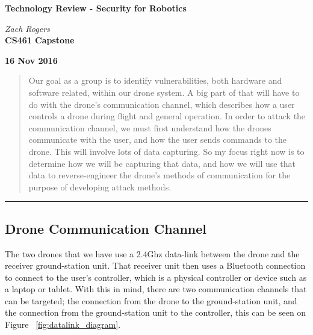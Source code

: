 \documentclass[IEEEtran,letterpaper,10pt,titlepage,draftclsnofoot,onecolumn]{article}
\begin{document}
\begin{titlepage}
  \begin{center}
    \vspace*{1cm}

    \huge
    \textbf{Technology Review - Security for Robotics}
  \vspace{0.5cm}

    \textit{Zach Rogers}\\
  \vspace{0.5cm}
    \vfill
    \large
    \textbf{CS461 Capstone}\\
  \vspace{5mm}

    \textbf{16 Nov 2016}\\

    \vfill
    \end{center}
\end{titlepage}

\begin{abstract}
Our goal as a group is to identify vulnerabilities, both hardware and software related, within our drone system.
A big part of that will have to do with the drone's communication channel, which describes how a user controls a
drone during flight and general operation. In order to attack the communication channel, we must first understand
how the drones communicate with the user, and how the user sends commands to the drone. This will involve lots of
data capturing. So my focus right now is to determine how we will be capturing that data, and how we will use that
data to reverse-engineer the drone's methods of communication for the purpose of developing attack methods.
\end{abstract}

\hrule\vspace{5mm}
\subsection*{Drone Communication Channel}
The two drones that we have use a 2.4Ghz data-link between the drone and the receiver ground-station unit.
That receiver unit then uses a Bluetooth connection to connect to the user's controller, which is a physical controller
or device such as a laptop or tablet.\cite{NazaM2} With this in mind, there are two communication channels that can be
targeted; the connection from the drone to the ground-station unit, and the connection from the ground-station unit
to the controller, this can be seen on Figure ~\ref{fig:datalink_diagram}\cite{NazaM2}.
\end{document}
